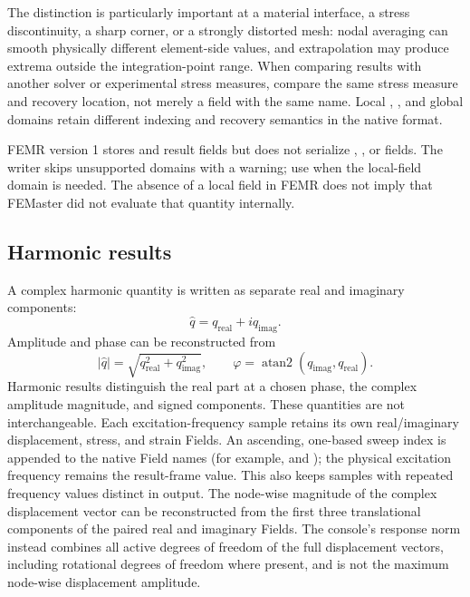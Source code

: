 The distinction is particularly important at a material interface, a stress discontinuity, a sharp corner, or a strongly distorted mesh: nodal averaging can smooth physically different element-side values, and extrapolation may produce extrema outside the integration-point range. When comparing results with another solver or experimental stress measures, compare the same stress measure and recovery location, not merely a field with the same name. Local , , and global  domains retain different indexing and recovery semantics in the native  format.

FEMR version 1 stores  and  result fields but does not serialize , , or  fields. The writer skips unsupported domains with a warning; use  when the local-field domain is needed. The absence of a local field in FEMR does not imply that FEMaster did not evaluate that quantity internally.

\subsection*{Harmonic results}

A complex harmonic quantity is written as separate real and imaginary components:
\[
\hat q=q_\mathrm{real}+i q_\mathrm{imag}.
\]
Amplitude and phase can be reconstructed from
\[
|\hat q|=\sqrt{q_\mathrm{real}^2+q_\mathrm{imag}^2},
\qquad
\varphi=\operatorname{atan2}(q_\mathrm{imag},q_\mathrm{real}).
\]
Harmonic results distinguish the real part at a chosen phase, the complex amplitude magnitude, and signed components. These quantities are not interchangeable.
Each excitation-frequency sample retains its own real/imaginary displacement, stress, and strain Fields. An ascending, one-based sweep index is appended to the native Field names (for example,  and ); the physical excitation frequency remains the result-frame value. This also keeps samples with repeated frequency values distinct in  output.
The node-wise magnitude of the complex displacement vector can be reconstructed from the first three translational components of the paired real and imaginary Fields. The console's response norm instead combines all active degrees of freedom of the full displacement vectors, including rotational degrees of freedom where present, and is not the maximum node-wise displacement amplitude.

